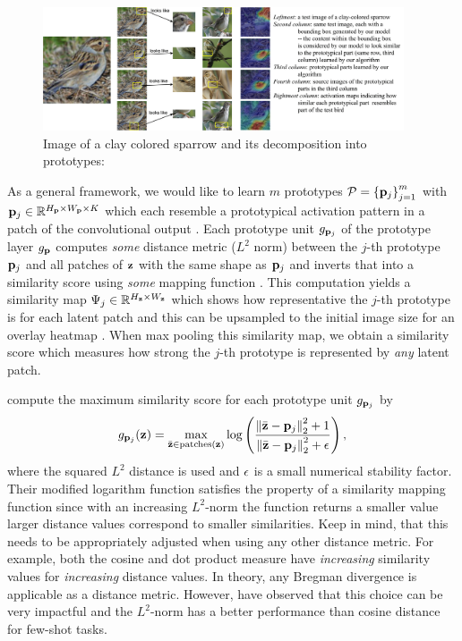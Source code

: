 \begin{figure}[h]
    \centering
    \includegraphics[width=0.95\textwidth]{Figures/Chapter3/introbird-1.png}
    \caption[Image of a clay colored sparrow and its decomposition into prototypes]{Image of a clay colored sparrow and its decomposition into prototypes: \citep{ChenLTBRS19}}
    \label{fig:looke_like}
\end{figure}
As a general framework, we would like to learn $m$ prototypes $\mathcal{P}=\left\{\mathbf{p}_{j}\right\}_{j=1}^{m}$ with $\mathbf{p}_{j} \in \mathbb{R}^{H_{\mathbf{p}} \times W_{\mathbf{p}} \times K}$ which each resemble a prototypical activation pattern in a patch of the convolutional output \citep{ChenLTBRS19}. Each prototype unit $g_{\mathbf{p}_{j}}$ of the prototype layer $g_{\mathbf{p}}$ computes \emph{some} distance metric (\eg $L^2$ norm) between the $j$-th prototype $\mathbf{p}_{j}$ and all patches of $\mathbf{z}$ with the same shape as $\mathbf{p}_{j}$ and inverts that into a similarity score using \emph{some} mapping function \citep{ChenLTBRS19}. This computation yields a similarity map $\Psi_j \in \mathbb{R}^{H_{\mathbf{z}} \times W_{\mathbf{z}}}$ which shows how representative the $j$-th prototype is for each latent patch and this can be upsampled to the initial image size for an overlay heatmap \citep{ChenLTBRS19}. When max pooling this similarity map, we obtain a similarity score which measures how strong the $j$-th prototype is represented by \emph{any} latent patch. 

\citet{ChenLTBRS19} compute the maximum similarity score for each prototype unit $g_{\mathbf{p}_{j}}$ by
\begin{equation}
\label{eq:prot_layer_function}
    g_{\mathbf{p}_{j}}(\mathbf{z}) = \max_{\Bar{\mathbf{z}} \in \text{patches}(\mathbf{z})} \log \left( \frac{\left\|\Bar{\mathbf{z}} - \mathbf{p}_{j}\right\|^2_2 + 1}{\left\|\Bar{\mathbf{z}} - \mathbf{p}_{j}\right\|^2_2 + \epsilon} \right),
\end{equation}
where the squared $L^2$ distance is used and $\epsilon$ is a small numerical stability factor. Their modified logarithm function satisfies the property of a similarity mapping function since with an increasing $L^2$-norm the function returns a smaller value \ie larger distance values correspond to smaller similarities. Keep in mind, that this needs to be appropriately adjusted when using any other distance metric. For example, both the cosine and dot product measure have \emph{increasing} similarity values for \emph{increasing} distance values. In theory, any Bregman divergence \citep{BanerjeeMDG04} is applicable as a distance metric. However, \citet{SnellSZ17} have observed that this choice can be very impactful and the $L^2$-norm has a better performance than cosine distance for few-shot tasks. 

